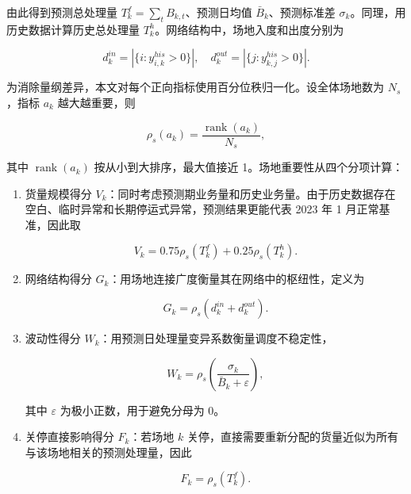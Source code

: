 \documentclass[UTF8,zihao=-4,a4paper,fontset=fandol]{ctexart}
\begin{document}
由此得到预测总处理量 $T_k^{f}=\sum_t B_{k,t}$、预测日均值 $\bar B_k$、预测标准差 $\sigma_k$。同理，用历史数据计算历史总处理量 $T_k^{h}$。网络结构中，场地入度和出度分别为



\begin{equation}
d_k^{in}=|\{i:y_{i,k}^{his}>0\}|,\quad d_k^{out}=|\{j:y_{k,j}^{his}>0\}|.
\end{equation}



为消除量纲差异，本文对每个正向指标使用百分位秩归一化。设全体场地数为 $N_s$，指标 $a_k$ 越大越重要，则



\begin{equation}
\rho_s(a_k)=\frac{\operatorname{rank}(a_k)}{N_s},
\end{equation}



其中 $\operatorname{rank}(a_k)$ 按从小到大排序，最大值接近 1。场地重要性从四个分项计算：



\begin{enumerate}

\item 货量规模得分 $V_k$：同时考虑预测期业务量和历史业务量。由于历史数据存在空白、临时异常和长期停运式异常，预测结果更能代表 2023 年 1 月正常基准，因此取

\begin{equation}
V_k=0.75\rho_s(T_k^f)+0.25\rho_s(T_k^h).
\end{equation}

\item 网络结构得分 $G_k$：用场地连接广度衡量其在网络中的枢纽性，定义为

\begin{equation}
G_k=\rho_s(d_k^{in}+d_k^{out}).
\end{equation}

\item 波动性得分 $W_k$：用预测日处理量变异系数衡量调度不稳定性，

\begin{equation}
W_k=\rho_s\left(\frac{\sigma_k}{\bar B_k+\varepsilon}\right),
\end{equation}

其中 $\varepsilon$ 为极小正数，用于避免分母为 0。

\item 关停直接影响得分 $F_k$：若场地 $k$ 关停，直接需要重新分配的货量近似为所有与该场地相关的预测处理量，因此

\begin{equation}
F_k=\rho_s(T_k^f).
\end{equation}

\end{enumerate}
\end{document}
